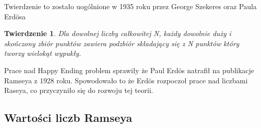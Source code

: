 \documentclass[11pt]{article}
\newtheorem{theorem}{Twierdzenie}
\begin{document}
Twierdzenie to zostało uogólnione w 1935 roku przez George Szekeres oraz Paula Erd\"osa

\begin{theorem}
Dla dowolnej liczby całkowitej N, każdy dowolnie duży i skończony zbiór punktów zawiera podzbiór składający się z N punktów który tworzy wielokąt wypukły.
\end{theorem}

Prace nad Happy Ending problem sprawiły że Paul Erd\"os natrafił na publikacje Ramseya z 1928 roku. Spowodowało to że Erd\"os rozpoczoł prace nad liczbami Raseya, co przyczyniło się do rozwoju tej teorii.

\subsection{Wartości liczb Ramseya}
\end{document}
